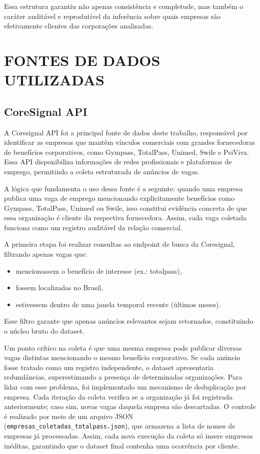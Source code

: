 Essa estrutura garantiu não apenas consistência e completude, mas também o caráter auditável e reprodutível da inferência sobre quais empresas são efetivamente clientes das corporações analisadas.

\section{FONTES DE DADOS UTILIZADAS}

\subsection{\textbf{CoreSignal API}}

A Coresignal API foi a principal fonte de dados deste trabalho, responsável por identificar as empresas que mantêm vínculos comerciais com grandes fornecedoras de benefícios corporativos, como Gympass, TotalPass, Unimed, Swile e PsiViva. Essa API disponibiliza informações de redes profissionais e plataformas de emprego, permitindo a coleta estruturada de anúncios de vagas.

A lógica que fundamenta o uso dessa fonte é a seguinte: quando uma empresa publica uma vaga de emprego mencionando explicitamente benefícios como Gympass, TotalPass, Unimed ou Swile, isso constitui evidência concreta de que essa organização é cliente da respectiva fornecedora. Assim, cada vaga coletada funciona como um registro auditável da relação comercial.

A primeira etapa foi realizar consultas ao endpoint de busca da Coresignal, filtrando apenas vagas que:
\begin{itemize}
    \item mencionassem o benefício de interesse (ex.: totalpass),
    \item fossem localizadas no Brasil,
    \item estivessem dentro de uma janela temporal recente (últimos meses).
\end{itemize}

Esse filtro garante que apenas anúncios relevantes sejam retornados, constituindo o núcleo bruto do dataset.

Um ponto crítico na coleta é que uma mesma empresa pode publicar diversas vagas distintas mencionando o mesmo benefício corporativo. Se cada anúncio fosse tratado como um registro independente, o dataset apresentaria redundâncias, superestimando a presença de determinadas organizações. Para lidar com esse problema, foi implementado um mecanismo de deduplicação por empresa. Cada iteração da coleta verifica se a organização já foi registrada anteriormente; caso sim, novas vagas daquela empresa são descartadas. O controle é realizado por meio de um arquivo JSON (\texttt{empresas\_coletadas\_totalpass.json}), que armazena a lista de nomes de empresas já processadas. Assim, cada nova execução da coleta só insere empresas inéditas, garantindo que o dataset final contenha uma ocorrência por cliente.

